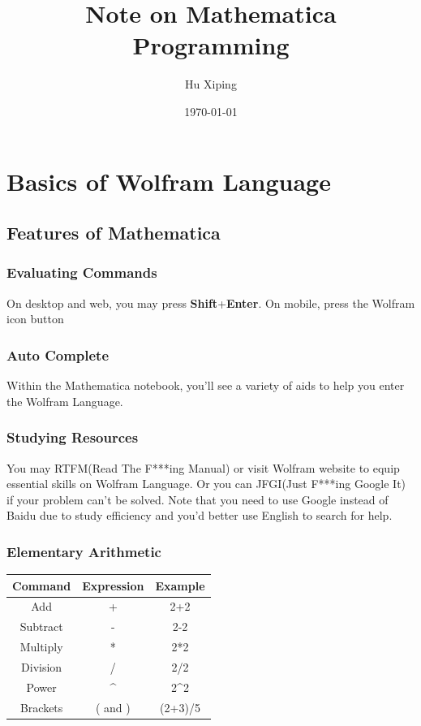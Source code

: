 \documentclass[UTF8]{book}
\begin{document}
	\sffamily
	\author{Hu Xiping}
	\title{Note on Mathematica Programming}
	\date{\today}
	\maketitle
	\tableofcontents
	\part{Basics of Wolfram Language}
		\chapter{Features of Mathematica}
			\section{Evaluating Commands}
				On desktop and web, you may press \textbf{Shift}+\textbf{Enter}. On mobile, press the Wolfram icon button
			\section{Auto Complete}
				Within the Mathematica notebook, you'll see a variety of aids to help you enter the Wolfram Language.
			\section{Studying Resources}
				You may RTFM(Read The F***ing Manual) or visit Wolfram website to equip essential skills on Wolfram Language. Or you can JFGI(Just F***ing Google It) if your problem can't be solved. Note that you need to use Google instead of Baidu due to study efficiency and you'd better use English to search for help.
			
			\section{Elementary Arithmetic}
				\begin{tabular}{|c|c|c|}
					\hline 
					Command & Expression & Example \\ 
					\hline 
					Add & + & 2+2 \\ 
					\hline
					Subtract & - & 2-2 \\ 
					\hline
					Multiply & * & 2*2 \\ 
					\hline
					Division & / & 2/2 \\ 
					\hline
					Power & \^{} & 2\^{}2 \\ 
					\hline
					Brackets & ( and ) & (2+3)/5 \\
					\hline
				\end{tabular} 
\end{document}
